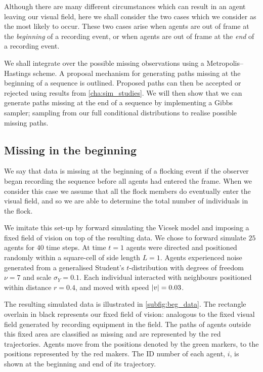 Although there are many different circumstances which can result in an agent
leaving our visual field, here we shall consider the two cases which we
consider as the most likely to occur. These two cases arise when agents are
out of frame at the \emph{beginning} of a recording event, or when
agents are out of frame at the \emph{end} of a recording event.

We shall integrate over the possible missing observations using a
Metropolis--Hastings scheme. A proposal mechanism for generating paths missing
at the beginning of a sequence is outlined. Proposed paths can then be accepted
or rejected using results from \cref{cha:sim_studies}. We will then show that
we can generate paths missing at the end of a sequence by implementing a Gibbs
sampler; sampling from our full conditional distributions to realise possible
missing paths.

\subsection{Missing in the beginning}

We say that data is missing at the beginning of a flocking event if the
observer began recording the sequence before all agents had entered the frame.
When we consider this case we assume that all the flock members do eventually
enter the visual field, and so we are able to determine the total number of
individuals in the flock.

We imitate this set-up by forward simulating the Vicsek model and imposing a
fixed field of vision on top of the resulting data. We chose to forward
simulate $25$ agents for $40$ time steps. At time $t=1$ agents were directed
and positioned randomly within a square-cell of side length $L=1$. Agents
experienced noise generated from a generalised Student's $t$-distribution with
degrees of freedom $\nu=7$ and scale $\sigma_Y=0.1$. Each individual interacted
with neighbours positioned within distance $r=0.4$, and moved with speed
$\abs{v}=0.03$.

The resulting simulated data is illustrated in \cref{subfig:beg_data}. The
rectangle overlain in black represents our fixed field of vision: analogous to
the fixed visual field generated by recording equipment in the field. The paths
of agents outside this fixed area are classified as missing and are represented
by the red trajectories. Agents move from the positions denoted by the green
markers, to the positions represented by the red makers. The ID number of
each agent, $i$, is shown at the beginning and end of its trajectory.

